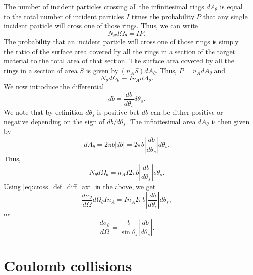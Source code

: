 \documentclass[a4paper,11pt]{report}
\begin{document}
The number of incident particles crossing all the infinitesimal rings $dA_\theta$ is equal to the total number of incident particles $I$ times the probability $P$ that any single incident particle will cross one of those rings. Thus, we can write
\begin{equation*}
    N_\theta d\Omega_\theta = I P.
\end{equation*}
The probability that an incident particle will cross one of those rings is simply the ratio of the surface area covered by all the rings in a section of the target material to the total area of that section. The surface area covered by all the rings in a section of area $S$ is given by $(n_A S) dA_\theta$. Thus, $P = n_A dA_\theta$ and 
\begin{equation*}
    N_\theta d\Omega_\theta = I n_A dA_\theta.
\end{equation*}
We now introduce the differential 
\begin{equation}
    \label{eq:cross_impact_differential}
    db = \frac{db}{d\theta_s} d\theta_s.
\end{equation}
We note that by definition $d\theta_s$ is positive but $db$ can be either positive or negative depending on the sign of $db/d\theta_s$. The infinitesimal area $dA_\theta$ is then given by 
\begin{equation}
    \label{eq:cross_impact_area}
    dA_\theta= 2\pi b |db| = 2 \pi b \left | \frac{db}{d\theta_s} \right | d \theta_s.
\end{equation}
Thus, 
\begin{equation*}
    N_\theta d\Omega_\theta = n_A I 2 \pi b \left | \frac{db}{d\theta_s} \right | d \theta_s.
\end{equation*}
Using \cref{eq:cross_def_diff_axi} in the above, we get
\begin{equation*}
    \frac{d\sigma_\theta}{d\Omega} d\Omega_\theta I n_A = I n_A 2 \pi b \left | \frac{db}{d\theta_s} \right | d \theta_s, 
\end{equation*}
or 
\begin{equation}
    \label{eq:cross_diff_impact_axi}
    \frac{d\sigma_\theta}{d\Omega} = \frac{b}{\sin \theta_s} \left | \frac{db}{d\theta_s} \right |.
\end{equation}

\section{Coulomb collisions}
\end{document}
